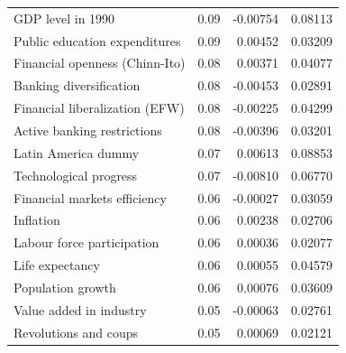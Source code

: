 \begin{refsection}
\begin{subappendices}
\begin{table}[!ht]
\begin{tabular}{lrrr}
      GDP level in 1990 & 0.09 & -0.00754 & 0.08113 \\ 
      Public education expenditures & 0.09 & 0.00452 & 0.03209 \\ 
      Financial openness (Chinn-Ito) & 0.08 & 0.00371 & 0.04077 \\ 
      Banking diversification & 0.08 & -0.00453 & 0.02891 \\ 
      Financial liberalization (EFW) & 0.08 & -0.00225 & 0.04299 \\ 
      Active banking restrictions & 0.08 & -0.00396 & 0.03201 \\ 
      Latin America dummy & 0.07 & 0.00613 & 0.08853 \\ 
      Technological progress & 0.07 & -0.00810 & 0.06770 \\ 
      Financial markets efficiency & 0.06 & -0.00027 & 0.03059 \\ 
      Inflation & 0.06 & 0.00238 & 0.02706 \\ 
      Labour force participation & 0.06 & 0.00036 & 0.02077 \\ 
      Life expectancy & 0.06 & 0.00055 & 0.04579 \\ 
      Population growth & 0.06 & 0.00076 & 0.03609 \\ 
      Value added in industry & 0.05 & -0.00063 & 0.02761 \\ 
      Revolutions and coups & 0.05 & 0.00069 & 0.02121 \\ 
       \bottomrule
    \end{tabular}
    \end{table}
    
    \clearpage
    

\end{subappendices}
\end{refsection}
